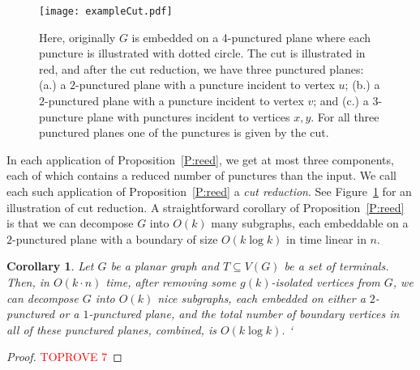 \documentclass{article}
\newtheorem{corollary}[theorem]{Corollary}
\numberwithin{claimcounter}{lemma}
\begin{document}
\begin{figure}
    \centering
    \texttt{[image: exampleCut.pdf]}
    \caption{Here, originally $G$ is embedded on a 4-punctured plane where each puncture is illustrated with dotted circle. The cut is illustrated in red, and after the cut reduction, we have three punctured planes: (a.) a $2$-punctured plane with a puncture incident to vertex $u$; (b.) a $2$-punctured plane with a puncture incident to vertex $v$; and (c.) a $3$-puncture plane with punctures incident to vertices $x,y$. For all three punctured planes one of the  punctures is given by the cut.}
    \label{fig:exampleCut}
\end{figure}

In each application of Proposition~\ref{P:reed}, we get at most three components, each of which contains a reduced number of punctures than the input. We call each such application of Proposition~\ref{P:reed} a {\em cut reduction}.  See Figure~\ref{fig:exampleCut} for an illustration of cut reduction. A straightforward corollary of Proposition~\ref{P:reed} is that we can decompose $G$ into $O(k)$  many subgraphs, each embeddable on a $2$-punctured plane with a boundary of size  $O(k \log k)$ in time linear in $n$.
\begin{corollary}\label{C:1imp}
    Let $G$ be a planar graph and $T\subseteq V(G)$ be a set of terminals. Then, in $O(k\cdot n)$ time, after removing some $g(k)$-isolated vertices from $G$, we can decompose $G$ into $O (k)$ nice subgraphs, each embedded on either a $2$-punctured or a $1$-punctured plane, and the total number of boundary vertices in all of these punctured planes, combined, is $O(k \log k)$.
`\end{corollary}
\begin{proof}\textcolor{red}{TOPROVE 7}\end{proof}
\end{document}
